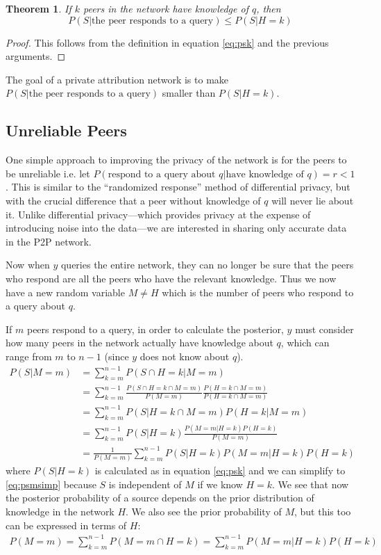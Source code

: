 \documentclass{article}
\newcommand{\eqnref}[1]{equation \eqref{eq:#1}}
\newtheorem{theorem}{Theorem}
\begin{document}
\begin{theorem}
	If $k$ peers in the network have knowledge of $q$, then
	\begin{equation*}
		P(S|\text{the peer responds to a query})\le P(S|H=k)
	\end{equation*}
\end{theorem}
\begin{proof}
	This follows from the definition in \eqnref{psk} and the previous arguments.
\end{proof}

The goal of a private attribution network is to make $P(S|\text{the peer
responds to a query})$ smaller than $P(S|H=k)$.

\subsection{Unreliable Peers}\label{sec:unreliable}

One simple approach to improving the privacy of the network is for the peers to
be unreliable i.e. let $P(\text{respond to a query about }q|\text{have knowledge
of }q)=r<1$. This is similar to the ``randomized response'' method of
differential privacy\cite{randresps}, but with the crucial difference that a peer
without knowledge of $q$ will never lie about it. Unlike differential
privacy---which provides privacy at the expense of introducing noise into the
data---we are interested in sharing only accurate data in the P2P network.

Now when $y$ queries the entire network, they can no longer be sure
that the peers who respond are all the peers who have the relevant knowledge.
Thus we now have a new random variable $M\ne H$ which is the number of peers who
respond to a query about $q$.

If $m$ peers respond to a query, in order to calculate the posterior, $y$ must
consider how many peers in the network actually have knowledge about $q$, which
can range from $m$ to $n-1$ (since $y$ does not know about $q$).
\begin{align}
	P(S|M=m)&=\sum_{k=m}^{n-1}P(S\cap H=k|M=m)\nonumber\\
	&=\sum_{k=m}^{n-1}\frac{P(S\cap H=k\cap M=m)}{P(M=m)}\frac{P(H=k\cap
	M=m)}{P(H=k\cap M=m)}\nonumber\\
	&=\sum_{k=m}^{n-1}P(S|H=k\cap M=m)P(H=k|M=m)\nonumber\\
	&=\sum_{k=m}^{n-1}P(S|H=k)\frac{P(M=m|H=k)P(H=k)}{P(M=m)}\label{eq:psmsimp}\\
	&=\frac{1}{P(M=m)}\sum_{k=m}^{n-1}P(S|H=k)P(M=m|H=k)P(H=k)\label{eq:psmbig}
\end{align}
where $P(S|H=k)$ is calculated as in \eqnref{psk} and we can simplify to
\eqref{eq:psmsimp} because $S$ is independent of $M$ if we know $H=k$.
We see that now the posterior probability of a source depends on the prior
distribution of knowledge in the network $H$. We also see the prior probability
of $M$, but this too can be expressed in terms of $H$:
\begin{align*}
	P(M=m)=\sum_{k=m}^{n-1}P(M=m\cap H=k)=\sum_{k=m}^{n-1}P(M=m|H=k)P(H=k)
\end{align*}
\end{document}
